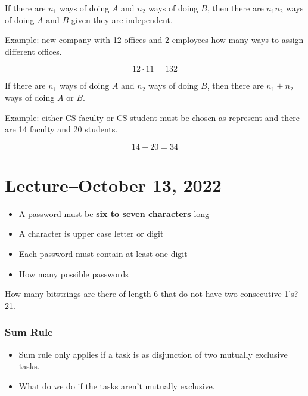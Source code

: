 \documentclass{scrreprt}
\begin{document}
\begin{definition}
    If there are $n_1$ ways of doing $A$ and $n_2$ ways of doing $B$, then there are $n_1n_2$ ways of doing $A$ and $B$ given they are independent.

    Example: new company with 12 offices and 2 employees how many ways to assign different offices.

    \[
        12 \cdot 11 = 132
    \]
\end{definition}

\begin{definition}
    If there are $n_1$ ways of doing $A$ and $n_2$ ways of doing $B$, then there are $n_1 + n_2$ ways of doing $A$ or $B$.

    Example: either CS faculty or CS student must be chosen as represent and there are 14 faculty and 20 students.

    \[
        14 + 20 = 34
    \]
\end{definition}

\section{Lecture--October 13, 2022}

\begin{definition}
    \begin{itemize}
        \item A password must be \textbf{six to seven characters} long
        \item A character is upper case letter or digit
        \item Each password must contain at least one digit
        \item How many possible passwords
    \end{itemize}
\end{definition}

\begin{example}
    How many bitstrings are there of length 6 that do not have two consecutive 1's? 21.
\end{example}

\subsubsection{Sum Rule}
\begin{itemize}
    \item Sum rule only applies if a task is as disjunction of two mutually exclusive tasks.
    \item What do we do if the tasks aren't mutually exclusive.
\end{itemize}
\end{document}
